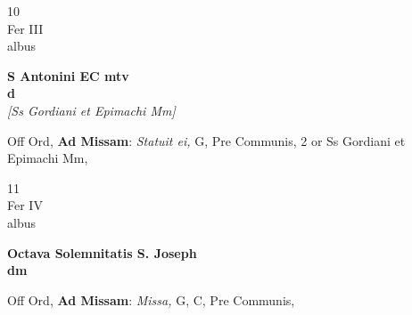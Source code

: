 \documentclass[10pt, openany]{book}
\begin{document}
        \begin{center}
            \begin{minipage}{3.5in}
                \vspace{2em}
                \begin{minipage}{0.5in}
                    {\Huge 10} \\
                    {\normalsize Fer III} \\
                    {\normalsize albus}
                \end{minipage}
                \begin{minipage}{3.0in}
                    \textbf{ \large S Antonini EC mtv \\
                    \textnormal{\normalsize d}} \\ \textit{[Ss Gordiani et Epimachi Mm]} \\ 
                \end{minipage}
                \begin{justify}Off Ord, \textbf{Ad Missam}: \textit{Statuit ei,} G, Pre Communis, 2 or Ss Gordiani et Epimachi Mm,  
                \end{justify}
            \end{minipage}
        \end{center}
    
        \begin{center}
            \begin{minipage}{3.5in}
                \vspace{2em}
                \begin{minipage}{0.5in}
                    {\Huge 11} \\
                    {\normalsize Fer IV} \\
                    {\normalsize albus}
                \end{minipage}
                \begin{minipage}{3.0in}
                    \textbf{ \large Octava Solemnitatis S. Joseph \\
                    \textnormal{\normalsize dm}} \\ 
                \end{minipage}
                \begin{justify}Off Ord, \textbf{Ad Missam}: \textit{Missa,} G, C, Pre Communis,  
                \end{justify}
            \end{minipage}
        \end{center}
    
\end{document}
